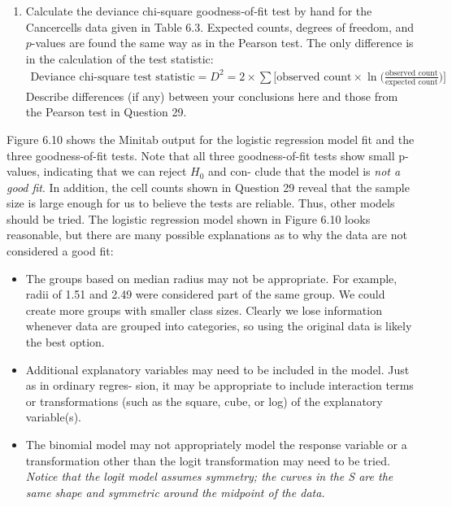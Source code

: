 \documentclass[
]{book}
\providecommand{\tightlist}{%
  \setlength{\itemsep}{0pt}\setlength{\parskip}{0pt}}
\begin{document}
\begin{enumerate}
\def\labelenumi{\arabic{enumi}.}
\setcounter{enumi}{29}
\tightlist
\item
  Calculate the deviance chi‐square goodness‐of‐fit test by hand for the Cancercells data given in Table 6.3. Expected counts, degrees of freedom, and \(p\)-values are found the same way as in the Pearson test. The only difference is in the calculation of the test statistic:\\
  \begin{align}
     \text{Deviance chi-square test statistic} = D^2 = 2 \times \sum \biggl[\text{observed count} \times \ln\bigl(\frac{\text{observed count}}{\text{expected count}}\bigr)\biggr]
     \tag{6.26}
     \end{align}
  Describe differences (if any) between your conclusions here and those from the Pearson test in Question 29.
\end{enumerate}

Figure 6.10 shows the Minitab output for the logistic regression model fit and the three goodness-of-fit tests.
Note that all three goodness-of-fit tests show small p-values, indicating that we can reject \(H_0\) and con-
clude that the model is \emph{not a good fit}. In addition, the cell counts shown in Question 29 reveal that the sample
size is large enough for us to believe the tests are reliable. Thus, other models should be tried. The logistic
regression model shown in Figure 6.10 looks reasonable, but there are many possible explanations as to why
the data are not considered a good fit:

\begin{itemize}
\item
  The groups based on median radius may not be appropriate. For example, radii of 1.51 and 2.49 were
  considered part of the same group. We could create more groups with smaller class sizes. Clearly we lose
  information whenever data are grouped into categories, so using the original data is likely the best option.
\item
  Additional explanatory variables may need to be included in the model. Just as in ordinary regres-
  sion, it may be appropriate to include interaction terms or transformations (such as the square, cube,
  or log) of the explanatory variable(s).
\item
  The binomial model may not appropriately model the response variable or a transformation other
  than the logit transformation may need to be tried. \emph{Notice that the logit model assumes symmetry; the curves in the S are the same shape and symmetric around the midpoint of the data.}
\end{itemize}
\end{document}

